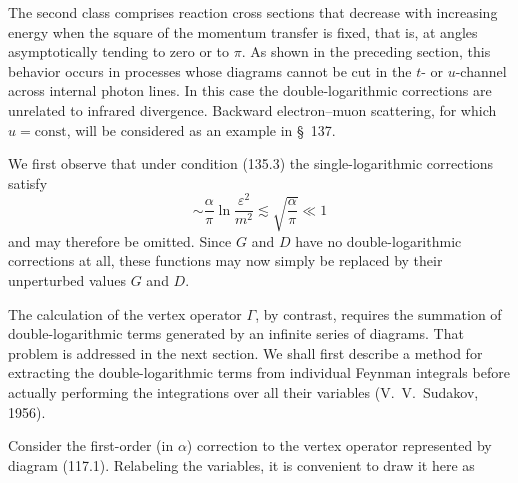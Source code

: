 The second class comprises reaction cross sections that decrease with increasing energy when the square of the momentum transfer is fixed, that is, at angles asymptotically tending to zero or to $\pi$. As shown in the preceding section, this behavior occurs in processes whose diagrams cannot be cut in the $t$- or $u$-channel across internal photon lines. In this case the double-logarithmic corrections are unrelated to infrared divergence. Backward electron--muon scattering, for which $u=\mathrm{const}$, will be considered as an example in \S~137.

We first observe that under condition (135.3) the single-logarithmic corrections satisfy
\[
\sim\frac{\alpha}{\pi}\ln\frac{\varepsilon^2}{m^2}\lesssim\sqrt{\frac{\alpha}{\pi}}\ll1
\]
and may therefore be omitted. Since $G$ and $D$ have no double-logarithmic corrections at all, these functions may now simply be replaced by their unperturbed values $G$ and $D$.

The calculation of the vertex operator $\Gamma$, by contrast, requires the summation of double-logarithmic terms generated by an infinite series of diagrams. That problem is addressed in the next section. We shall first describe a method for extracting the double-logarithmic terms from individual Feynman integrals before actually performing the integrations over all their variables (V.~V.~Sudakov, 1956).

Consider the first-order (in $\alpha$) correction to the vertex operator represented by diagram (117.1). Relabeling the variables, it is convenient to draw it here as

